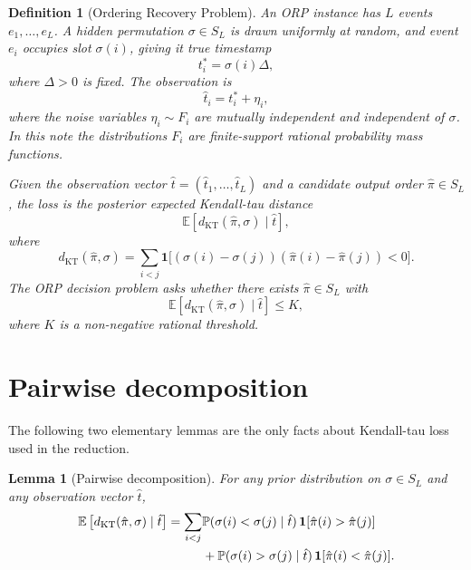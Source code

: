 \documentclass[11pt]{article}
\newtheorem{definition}{Definition}
\newtheorem{lemma}{Lemma}
\newcommand{\E}{\mathbb{E}}
\newcommand{\Prb}{\mathbb{P}}
\newcommand{\ind}{\mathbf{1}}
\newcommand{\KT}{\operatorname{KT}}
\begin{document}
\begin{definition}[Ordering Recovery Problem]
An ORP instance has $L$ events $e_1,\ldots,e_L$.  A hidden permutation $\sigma\in S_L$ is drawn uniformly at random, and event $e_i$ occupies slot $\sigma(i)$, giving it true timestamp
\begin{equation}
  t_i^*=\sigma(i)\Delta,
\end{equation}
where $\Delta>0$ is fixed.  The observation is
\begin{equation}
  \hat t_i=t_i^*+\eta_i,
\end{equation}
where the noise variables $\eta_i\sim F_i$ are mutually independent and independent of $\sigma$.  In this note the distributions $F_i$ are finite-support rational probability mass functions.

Given the observation vector $\hat t=(\hat t_1,\ldots,\hat t_L)$ and a candidate output order $\hat\pi\in S_L$, the loss is the posterior expected Kendall-tau distance
\begin{equation}
  \E\left[d_{\KT}(\hat\pi,\sigma)\mid \hat t\right],
\end{equation}
where
\begin{equation}
  d_{\KT}(\hat\pi,\sigma)
  =\sum_{i<j}
  \ind\!\big[(\sigma(i)-\sigma(j))(\hat\pi(i)-\hat\pi(j))<0\big].
\end{equation}
The ORP decision problem asks whether there exists $\hat\pi\in S_L$ with
\begin{equation}
  \E\left[d_{\KT}(\hat\pi,\sigma)\mid \hat t\right]\le K,
\end{equation}
where $K$ is a non-negative rational threshold.
\end{definition}

\section{Pairwise decomposition}

The following two elementary lemmas are the only facts about Kendall-tau loss used in the reduction.

\begin{lemma}[Pairwise decomposition]
For any prior distribution on $\sigma\in S_L$ and any observation vector $\hat t$,
\begin{align}
  \E\left[d_{\KT}(\hat\pi,\sigma)\mid \hat t\right]
  =\sum_{i<j} &\Prb(\sigma(i)<\sigma(j)\mid \hat t)\,\ind[\hat\pi(i)>\hat\pi(j)] \notag\\
  &+\Prb(\sigma(i)>\sigma(j)\mid \hat t)\,\ind[\hat\pi(i)<\hat\pi(j)].
\end{align}
\end{lemma}
\end{document}
